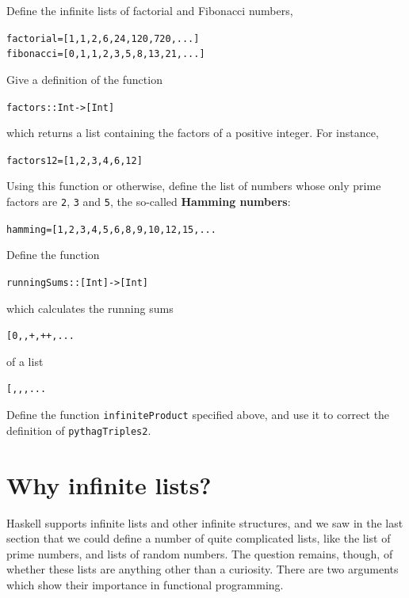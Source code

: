 \begin{exercises}

\item 
Define the infinite lists of factorial and Fibonacci numbers, 
\begin{alltt}
factorial = [1,1,2,6,24,120,720,...]
fibonacci = [0,1,1,2,3,5,8,13,21,...]
\end{alltt}

\item
Give a definition of the function
\begin{alltt}
factors :: Int -> [Int]
\end{alltt}
which returns a list containing the factors of a positive integer. For
instance,
\begin{alltt}
factors 12 = [1,2,3,4,6,12]
\end{alltt}
Using this function or otherwise, define the list of numbers whose only prime
factors are \texttt{2}, \texttt{3} and \texttt{5}, the so-called \textbf{Hamming numbers}:
\label{HamNos}
\begin{alltt}
hamming = [1,2,3,4,5,6,8,9,10,12,15,...
\end{alltt}

\item
Define the function
\begin{alltt}
runningSums :: [Int] -> [Int]
\end{alltt}
which calculates the running sums
\begin{alltt}
[0,,+,++,...
\end{alltt}
of a list
\begin{alltt}
[,,,...
\end{alltt}

\item
Define the function \texttt{infiniteProduct} specified above, and use it to
correct the definition of \texttt{pythagTriples2}.
\end{exercises}
\section{Why infinite lists?}
\label{whyInfLis}

Haskell supports infinite lists and other infinite structures, 
and we saw in the last section that we could define a number of quite
complicated
lists, like the list of prime numbers, and lists of random numbers. The
question remains, though, of whether these lists are anything other than a
curiosity. There are two arguments which show their importance in functional
programming.

